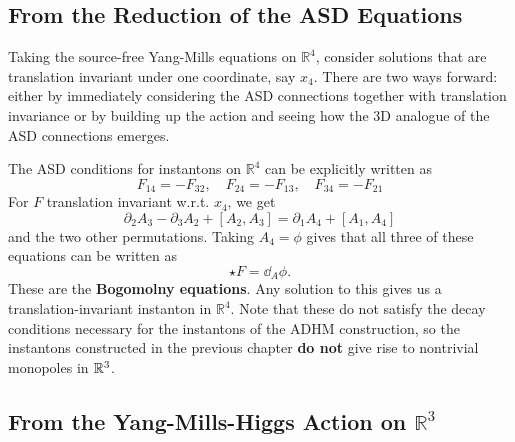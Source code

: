 	\subsection{From the Reduction of the ASD Equations}
	Taking the source-free Yang-Mills equations on $\mathbb R^4$, consider solutions that are translation invariant under one coordinate, say $x_4$. There are two ways forward: either by immediately considering the ASD connections together with translation invariance or by building up the action and seeing how the 3D analogue of the ASD connections emerges. 
	
	\begin{obs}
		The ASD conditions for instantons on $\mathbb R^4$ can be explicitly written as
		\begin{equation}
			F_{14}=-F_{32}, \quad F_{24}=-F_{13}, \quad F_{34}=-F_{21}
		\end{equation}
		For $F$ translation invariant w.r.t. $x_4$, we get
		\begin{equation}
			\partial_{2} A_3 - \partial_3 A_2 + [A_2, A_3] = \partial_1 A_4 + [A_1, A_4]
		\end{equation}
		and the two other permutations. Taking $A_4 = \phi$ gives that all three of these equations can be written as
		\begin{equation}
			\star F = \dd_A \phi.
		\end{equation}
		These are the \textbf{Bogomolny equations}. Any solution to this gives us a translation-invariant instanton in $\mathbb R^4$. Note that these do not satisfy the decay conditions necessary for the instantons of the ADHM construction, so the instantons constructed in the previous chapter \textbf{do not} give rise to nontrivial monopoles in $\mathbb{R}^3$.
	\end{obs}
	
	\subsection{From the Yang-Mills-Higgs Action on $\mathbb R^3$} %
	\label{sub:from_the_yang_mills_higgs_action_on_mathbb_r_3}

